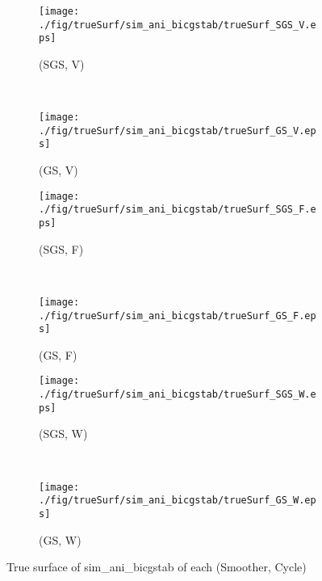 \begin{figure}
  \centering
  \begin{subfigure}[h]{0.45\textwidth}
    \texttt{[image: ./fig/trueSurf/sim\_ani\_bicgstab/trueSurf\_SGS\_V.eps]}
    \caption{(SGS, V)}
  \end{subfigure}
  ~
  \begin{subfigure}[h]{0.45\textwidth}
    \texttt{[image: ./fig/trueSurf/sim\_ani\_bicgstab/trueSurf\_GS\_V.eps]}
    \caption{(GS, V)}
  \end{subfigure}
  
  \begin{subfigure}[h]{0.45\textwidth}
    \texttt{[image: ./fig/trueSurf/sim\_ani\_bicgstab/trueSurf\_SGS\_F.eps]}
    \caption{(SGS, F)}
  \end{subfigure}
  ~
  \begin{subfigure}[h]{0.45\textwidth}
    \texttt{[image: ./fig/trueSurf/sim\_ani\_bicgstab/trueSurf\_GS\_F.eps]}
    \caption{(GS, F)}
  \end{subfigure}
  
  \begin{subfigure}[h]{0.45\textwidth}
    \texttt{[image: ./fig/trueSurf/sim\_ani\_bicgstab/trueSurf\_SGS\_W.eps]}
    \caption{(SGS, W)}
  \end{subfigure}
  ~
  \begin{subfigure}[h]{0.45\textwidth}
    \texttt{[image: ./fig/trueSurf/sim\_ani\_bicgstab/trueSurf\_GS\_W.eps]}
    \caption{(GS, W)}
  \end{subfigure}
  \caption{True surface of sim\_ani\_bicgstab of each (Smoother, Cycle)}\label{fig:trueSurf_sim_ani_bicgstab}
\end{figure}

